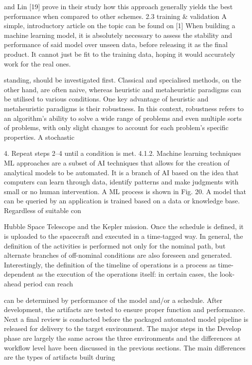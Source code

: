 \documentclass[a4paper,12pt]{article}
\begin{document}
and Lin [19] prove in their study how this approach generally yields
the best performance when compared to other schemes.
2.3
training & validation
A simple,
introductory article
on the topic can be
found on [1]
When building a machine learning model, it is absolutely necessary
to assess the stability and performance of said model over unseen
data, before releasing it as the ﬁnal product. It cannot just be ﬁt to
the training data, hoping it would accurately work for the real ones.

standing, should be investigated first. Classical and specialised methods, 
on the other hand, are often naive, whereas heuristic and metaheuristic 
paradigms can be utilised to various conditions. One key advantage of 
heuristic and metaheuristic paradigms is their robustness. In this 
context, robustness refers to an algorithm’s ability to solve a wide range 
of problems and even multiple sorts of problems, with only slight 
changes to account for each problem’s specific properties. A stochastic

4. Repeat steps 2–4 until a condition is met. 
4.1.2. Machine learning techniques 
ML approaches are a subset of AI techniques that allows for the 
creation of analytical models to be automated. It is a branch of AI based 
on the idea that computers can learn through data, identify patterns and 
make judgments with small or no human intervention. A ML process is 
shown in Fig. 20. A model that can be queried by an application is 
trained based on a data or knowledge base. Regardless of suitable con­

Hubble Space Telescope and the Kepler mission. Once the schedule is defined, it is 
uploaded to the spacecraft and executed in a time-tagged way. In general, the 
definition of the activities is performed not only for the nominal path, but alternate 
branches of off-nominal conditions are also foreseen and generated. Interestingly, 
the definition of the timeline of operations is a process as time-dependent as the 
execution of the operations itself: in certain cases, the look-ahead period can reach

can be determined by performance of the model and/or a schedule.
After development, the artifacts are tested to ensure proper function and performance. Next a ﬁnal review is conducted
before the packaged automated model pipeline is released for delivery to the target environment.
The major steps in the Develop phase are largely the same across the three environments and the diﬀerences at
workﬂow level have been discussed in the previous sections. The main diﬀerences are the types of artifacts built during
\end{document}
